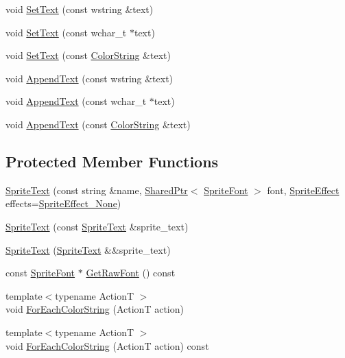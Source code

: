 \begin{DoxyCompactItemize}
\item 
void \hyperlink{classmage_1_1_sprite_text_ac33e512ab29554a306ada9a378ab00eb}{Set\+Text} (const wstring \&text)
\item 
void \hyperlink{classmage_1_1_sprite_text_a03d5012e2812d422a1285a4a0abb104f}{Set\+Text} (const wchar\+\_\+t $\ast$text)
\item 
void \hyperlink{classmage_1_1_sprite_text_a3ca23b77ab252f226d6525dfc2cb3d11}{Set\+Text} (const \hyperlink{structmage_1_1_color_string}{Color\+String} \&text)
\item 
void \hyperlink{classmage_1_1_sprite_text_acf993532a7b2e6ebb761b9b47cbdba98}{Append\+Text} (const wstring \&text)
\item 
void \hyperlink{classmage_1_1_sprite_text_a462809b9138f94720f972505a4f74d81}{Append\+Text} (const wchar\+\_\+t $\ast$text)
\item 
void \hyperlink{classmage_1_1_sprite_text_a914e7f755cf8b6ddd22dd66c9108029b}{Append\+Text} (const \hyperlink{structmage_1_1_color_string}{Color\+String} \&text)
\end{DoxyCompactItemize}
\subsection*{Protected Member Functions}
\begin{DoxyCompactItemize}
\item 
\hyperlink{classmage_1_1_sprite_text_a929b24bba456bfd37a9ebf04db88d4c5}{Sprite\+Text} (const string \&name, \hyperlink{namespacemage_a1e01ae66713838a7a67d30e44c67703e}{Shared\+Ptr}$<$ \hyperlink{classmage_1_1_sprite_font}{Sprite\+Font} $>$ font, \hyperlink{namespacemage_a9cfe18123066ba4236f548f9de75d881}{Sprite\+Effect} effects=\hyperlink{namespacemage_a9cfe18123066ba4236f548f9de75d881af3c275fbfacfe174da928b2f24dfa515}{Sprite\+Effect\+\_\+\+None})
\item 
\hyperlink{classmage_1_1_sprite_text_a3e56a7882dd714a6d8f2452d4f7071ff}{Sprite\+Text} (const \hyperlink{classmage_1_1_sprite_text}{Sprite\+Text} \&sprite\+\_\+text)
\item 
\hyperlink{classmage_1_1_sprite_text_ab03ba1fb607ce86d28b742fc020c8a62}{Sprite\+Text} (\hyperlink{classmage_1_1_sprite_text}{Sprite\+Text} \&\&sprite\+\_\+text)
\item 
const \hyperlink{classmage_1_1_sprite_font}{Sprite\+Font} $\ast$ \hyperlink{classmage_1_1_sprite_text_ab67ba17af1b19766343d04f10853c8d6}{Get\+Raw\+Font} () const
\item 
{\footnotesize template$<$typename ActionT $>$ }\\void \hyperlink{classmage_1_1_sprite_text_ad975957b908ad3926ace75fb60ff4474}{For\+Each\+Color\+String} (ActionT action)
\item 
{\footnotesize template$<$typename ActionT $>$ }\\void \hyperlink{classmage_1_1_sprite_text_abc70368fd800a82cbd1ec31f51d4db17}{For\+Each\+Color\+String} (ActionT action) const
\end{DoxyCompactItemize}
